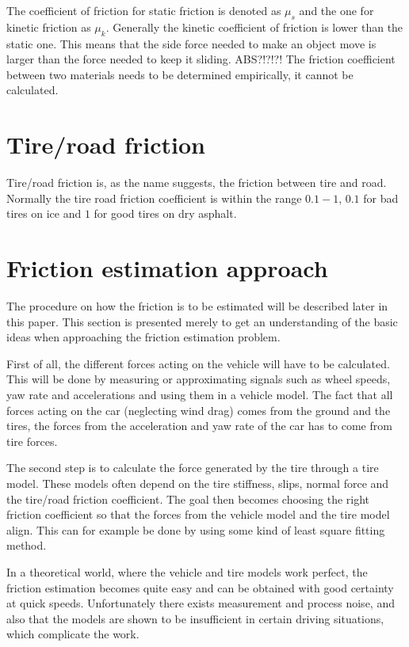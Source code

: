 The coefficient of friction for static friction is denoted as $ \mu_{s} $ and the one for kinetic friction as $ \mu_{k} $. Generally the kinetic coefficient of friction is lower than the static one. This means that the side force needed to make an object move is larger than the force needed to keep it sliding. ABS?!?!?! The friction coefficient between two materials needs to be determined empirically, it cannot be calculated. 

\section{Tire/road friction}
Tire/road friction is, as the name suggests, the friction between tire and road. Normally the tire road friction coefficient is within the range $ 0.1 - 1 $, $ 0.1 $ for bad tires on ice and $ 1 $ for good tires on dry asphalt. 

\section{Friction estimation approach}

The procedure on how the friction is to be estimated will be described later in this paper. This section is presented merely to get an understanding of the basic ideas when approaching the friction estimation problem.

First of all, the different forces acting on the vehicle will have to be calculated. This will be done by measuring or approximating signals such as wheel speeds, yaw rate and accelerations and using them in a vehicle model. The fact that all forces acting on the car (neglecting wind drag) comes from the ground and the tires, the forces from the acceleration and yaw rate of the car has to come from tire forces. 

The second step is to calculate the force generated by the tire through a tire model. These models often depend on the tire stiffness, slips, normal force and the tire/road friction coefficient. The goal then becomes choosing the right friction coefficient so that the forces from the vehicle model and the tire model align. This can for example be done by using some kind of least square fitting method. 

In a theoretical world, where the vehicle and tire models work perfect, the friction estimation becomes quite easy and can be obtained with good certainty at quick speeds. Unfortunately there exists measurement and process noise, and also that the models are shown to be insufficient in certain driving situations, which complicate the work.


